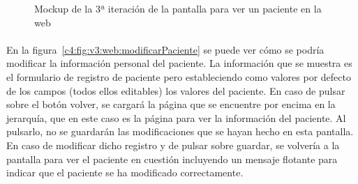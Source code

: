\begin{figure}[H]
    \centering
    \caption[Mockup de la 3ª iteración de la pantalla para ver un paciente en la web]{Mockup de la 3ª iteración de la pantalla para ver un paciente en la web}
    \label{c4:fig:v3:web:verPaciente}
\end{figure}

\paragraph{}
En la figura~\ref{c4:fig:v3:web:modificarPaciente} se puede ver cómo se podría modificar la información personal del paciente. La información que se muestra es el formulario de registro de paciente pero estableciendo como valores por defecto de los campos (todos ellos editables) los valores del paciente. En caso de pulsar sobre el botón volver, se cargará la página que se encuentre por encima en la jerarquía, que en este caso es la página para ver la información del paciente. Al pulsarlo, no se guardarán las modificaciones que se hayan hecho en esta pantalla. En caso de modificar dicho registro y de pulsar sobre guardar, se volvería a la pantalla para ver el paciente en cuestión incluyendo un mensaje flotante para indicar que el paciente se ha modificado correctamente.

